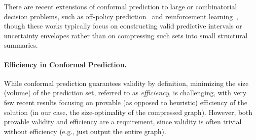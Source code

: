 There are recent extensions of conformal prediction to large or combinatorial decision problems, such as off-policy prediction~\cite{zhang2023conformal_offpolicy,taufiq2022conformal_copp} and reinforcement learning~\cite{plancp_2024,strawn2023conformal_psf}, though these works typically focus on constructing valid predictive intervals or uncertainty envelopes rather than on compressing such sets into small structural summaries.  %

\paragraph{Efficiency in Conformal Prediction.} 
While conformal prediction guarantees validity by definition, minimizing the size (volume) of the prediction set, referred to as \textit{efficiency}, is challenging, with very  few recent results focusing on provable (as opposed to heuristic) efficiency of the solution (in our case, the size-optimality of the compressed graph). However, both provable validity and efficiency are a requirement, since validity is often trivial without efficiency (e.g., just output the entire graph).  %

